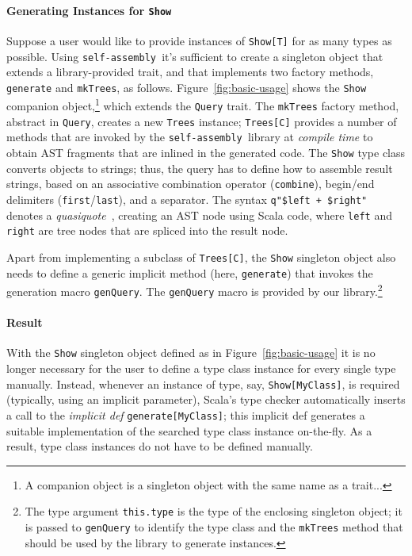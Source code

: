 \documentclass[preprint]{sigplanconf}
\newcommand{\selfassembly}{\texttt{self-assembly~}}
\begin{document}
\paragraph{Generating Instances for \texttt{Show}} Suppose a user would like
to provide instances of \verb|Show[T]| for as many
types as possible. Using \selfassembly it's sufficient to create a singleton
object that extends a library-provided trait, and that implements two factory
methods, \verb|generate| and \verb|mkTrees|, as follows.
Figure~\ref{fig:basic-usage} shows the \verb|Show| companion object,\footnote{A companion
object is a singleton object with the same name as a trait...} which extends
the \verb|Query| trait. The \verb|mkTrees| factory method, abstract in \verb|Query|,
creates a new \verb|Trees| instance; \verb|Trees[C]| provides a number of methods that
are invoked by the \selfassembly library at \emph{compile time} to obtain AST fragments that are
inlined in the generated code. The \verb|Show| type class converts objects to
strings; thus, the query has to define how to assemble result strings, based
on an associative combination operator (\verb|combine|), begin/end delimiters
(\verb|first|/\verb|last|), and a separator. The syntax
\verb|q"$left + $right"| denotes a \emph{quasiquote}~\cite{Quasiquotes},
creating an AST node using Scala code, where \verb|left| and \verb|right|
are tree nodes that are spliced into the result node.

Apart from implementing a subclass of \verb|Trees[C]|, the \verb|Show|
singleton object also needs to define a generic implicit method (here,
\verb|generate|) that invokes the generation macro \verb|genQuery|. The
\verb|genQuery| macro is provided by our library.\footnote{The type argument
\texttt{this.type} is the type of the enclosing singleton object; it is passed
to \texttt{genQuery} to identify the type class and the \texttt{mkTrees}
method that should be used by the library to generate instances.}

\paragraph{Result} With the \verb|Show| singleton object defined as in Figure~\ref{fig:basic-usage}
it is no longer necessary for the user to define a type class instance for every single type manually.
Instead, whenever an instance of type, say, \verb|Show[MyClass]|, is required
(typically, using an implicit parameter), Scala's type checker automatically inserts
a call to the \emph{implicit def} \verb|generate[MyClass]|; this implicit def generates a
suitable implementation of the searched type class instance on-the-fly. As a result,
type class instances do not have to be defined manually.
\end{document}
